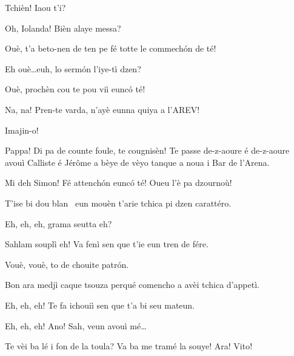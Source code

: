 \begin{drama}

\Iolandaspeaks {} Tchièn! Iaou t'i?


\Cienspeaks {} Oh, Iolanda! Bièn alaye messa?

\Iolandaspeaks Ouè, t’a beto-nen de ten pe fé totte le commech\'on de té!

\Cienspeaks Eh ouè\ldots euh, lo serm\'on l'iye-tì dzen?

\Iolandaspeaks  Ouè, prochèn cou te pou viì eunc\'o té!

\Cienspeaks Na, na! Pren-te varda, n’ayè eunna quiya a l’AREV!

\Iolandaspeaks Imajin-o!

\Simonspeaks Pappa! Di pa de counte foule, te cougnisèn! Te passe de-z-aoure é de-z-aoure avouì Calliste é Jérôme a bèye de vèyo tanque a noua i Bar de l’Arena.

\Cienspeaks Mi deh Simon! Fé attench\'on eunc\'o té! Oueu l’è pa dzournoù!

\Iolandaspeaks T’ise bi dou blan \vino\ eun mouèn t’arie tchica pi dzen carattéro.

\Sahlammspeaks {}  Eh, eh, eh, grama seutta eh?

\Cienspeaks Sahlam souplì eh! Va fenì sen que t’ie eun tren de fére.

\Sahlammspeaks Vouè, vouè, to de chouite patr\'on.


\Cienspeaks {} Bon ara medjì caque tsouza perqué comencho a avèi tchica d’appetì.

\Sahlammspeaks {} Eh, eh, eh! Te fa ichouiì sen que t’a bi seu mateun. 


\Cienspeaks {} Eh, eh, eh! Ano! Sah, veun avouì mé\ldots


\Cienspeaks {} Te vèi ba lé i fon de la toula? Va ba me tramé la souye! Ara! Vito! 


\end{drama}
